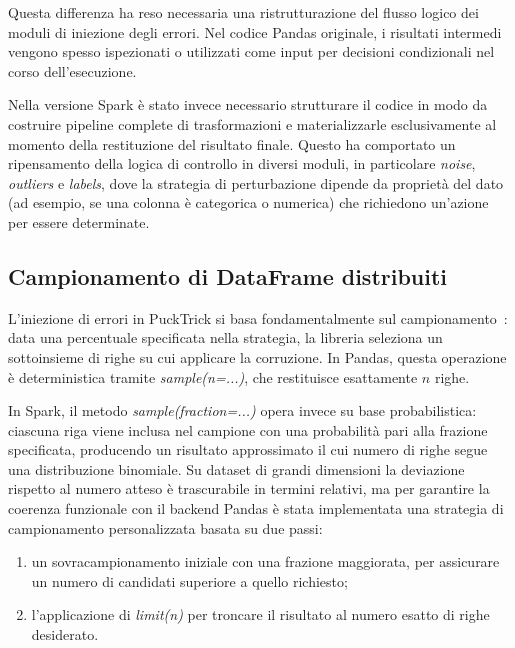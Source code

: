 \documentclass[../main.tex]{subfiles}
\begin{document}
Questa differenza ha reso necessaria una ristrutturazione del flusso logico dei moduli di iniezione degli errori. Nel codice Pandas originale, i risultati intermedi vengono spesso ispezionati o utilizzati come input per decisioni condizionali nel corso dell'esecuzione. 

Nella versione Spark è stato invece necessario strutturare il codice in modo da costruire pipeline complete di trasformazioni e materializzarle esclusivamente al momento della restituzione del risultato finale. Questo ha comportato un ripensamento della logica di controllo in diversi moduli, in particolare \textit{noise}, \textit{outliers} e \textit{labels}, dove la strategia di perturbazione dipende da proprietà del dato (ad esempio, se una colonna è categorica o numerica) che richiedono un'azione per essere determinate.


\subsection{Campionamento di DataFrame distribuiti}
\label{subsec:campionamento}
L'iniezione di errori in PuckTrick si basa fondamentalmente sul 
campionamento~\cite{agostini2025pucktricklibrarymakingsynthetic}: 
data una percentuale specificata nella strategia, la libreria seleziona 
un sottoinsieme di righe su cui applicare la corruzione. In Pandas, questa 
operazione è deterministica tramite \textit{sample(n=...)}, che restituisce 
esattamente $n$ righe.

In Spark, il metodo \textit{sample(fraction=...)} opera invece su base probabilistica: ciascuna riga viene inclusa nel campione con una probabilità pari alla frazione specificata, producendo un risultato approssimato il cui numero di righe segue una distribuzione binomiale. Su dataset di grandi dimensioni la deviazione rispetto al numero atteso è trascurabile in termini relativi, ma per garantire la coerenza funzionale con il backend Pandas è stata implementata una strategia di campionamento personalizzata basata su due passi:

\begin{enumerate}
    \item un sovracampionamento iniziale con una frazione maggiorata, 
    per assicurare un numero di candidati superiore a quello richiesto;
    \item l'applicazione di \textit{limit(n)} per troncare il risultato 
    al numero esatto di righe desiderato.
\end{enumerate}
\end{document}
